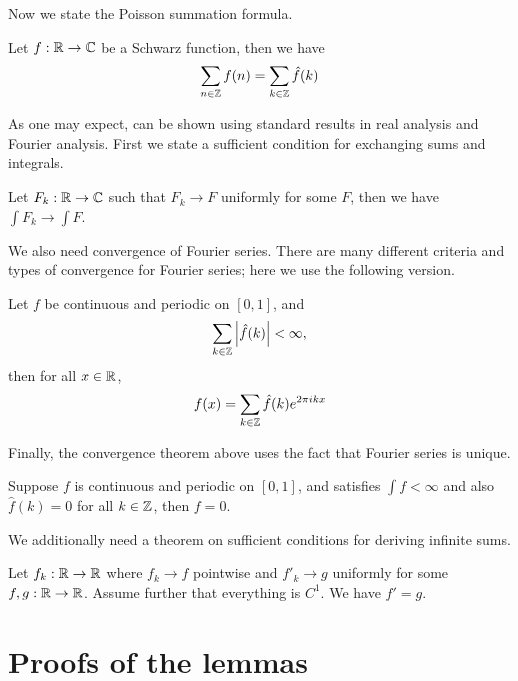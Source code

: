 \documentclass{article}
\begin{document}
Now we state the Poisson summation formula.
\begin{lemma}
	\label{lemma:Poisson-summation}
	Let $f:\mathbb{R}\rightarrow\mathbb{C}$ be a Schwarz function, then we have
	\begin{equation}
		\sum_{n\in\mathbb{Z}}f(n)=\sum_{k\in\mathbb{Z}}\hat{f}(k)
	\end{equation}
\end{lemma}

As one may expect,  can be shown using standard results in real analysis and Fourier analysis.
First we state a sufficient condition for exchanging sums and integrals.
\begin{theorem}
	\label{theorem:exchange-sum-and-integral}
	Let $F_k:\mathbb{R}\rightarrow\mathbb{C}$ such that $F_k\rightarrow F$ uniformly for some $F$, then we have $\int F_k\rightarrow \int F$.
\end{theorem}
We also need convergence of Fourier series.
There are many different criteria and types of convergence for Fourier series;
here we use the following version.
\begin{theorem}
	\label{theorem:Fourier-converge}
	Let $f$ be continuous and periodic on $[0, 1]$, and
	\begin{equation}
		\sum_{k\in\mathbb{Z}}\abs{\hat{f}(k)}<\infty,
	\end{equation}
	then for all $x\in\mathbb{R}$,
	\begin{equation}
		f(x)=\sum_{k\in\mathbb{Z}}\hat{f}(k)e^{2\pi ikx}
	\end{equation}
\end{theorem}
Finally, the convergence theorem above uses the fact that Fourier series is unique.
\begin{theorem}
	\label{theorem:Fourier-unique}
	Suppose $f$ is continuous and periodic on $[0, 1]$, and satisfies $\int f<\infty$ and also $\hat{f}(k)=0$ for all $k\in\mathbb{Z}$, then $f=0$.
\end{theorem}

We additionally need a theorem on sufficient conditions for deriving infinite sums.
\begin{theorem}
	\label{theorem:derive-infinite-sum}
	Let $f_k:\mathbb{R}\rightarrow\mathbb{R}$ where $f_k\rightarrow f$ pointwise and $f'_k\rightarrow g$ uniformly for some $f, g: \mathbb{R}\rightarrow\mathbb{R}$.
	Assume further that everything is $C^1$.
	We have $f'=g$.
\end{theorem}

\section{Proofs of the lemmas}
\end{document}
